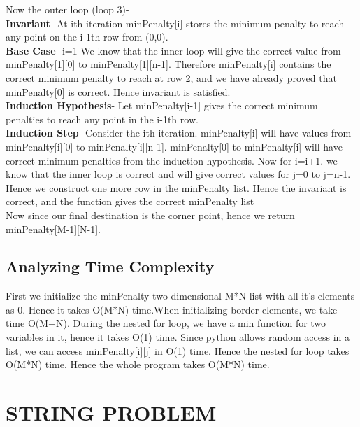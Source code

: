 \documentclass{article}
\begin{document}
Now the outer loop (loop 3)- \\
\textbf{Invariant}- At ith iteration minPenalty[i] stores the minimum penalty to reach any point on the i-1th row from (0,0).\\
\textbf{Base Case}- i=1 We know that the inner loop will give the correct value from minPenalty[1][0] to minPenalty[1][n-1]. Therefore minPenalty[i] contains the correct minimum penalty to reach at row 2, and we have already proved that minPenalty[0] is correct. Hence invariant is satisfied.\\
\textbf{Induction Hypothesis}- Let minPenalty[i-1] gives the correct minimum penalties to reach any point in the i-1th row.\\
\textbf{Induction Step}- Consider the ith iteration. minPenalty[i] will have values from minPenalty[i][0] to minPenalty[i][n-1]. minPenalty[0] to minPenalty[i] will have correct minimum penalties from the induction hypothesis.  Now for i=i+1. we know that the inner loop is correct and will give correct values for j=0 to j=n-1. Hence we construct one more row in the minPenalty list. Hence the invariant is correct, and the function gives the correct minPenalty list\\
Now since our final destination is the corner point, hence we return minPenalty[M-1][N-1]. 

\subsection{Analyzing Time Complexity}
First we initialize the minPenalty two dimensional M*N list with all it's elements as 0. Hence it takes O(M*N) time.When initializing border elements, we take time O(M+N). During the nested for loop, we have a min function for two variables in it, hence it takes O(1) time. Since python allows random access in a list, we can access minPenalty[i][j] in O(1) time. Hence the nested for loop takes O(M*N) time. Hence the whole program takes O(M*N) time.


\section{STRING PROBLEM}
\end{document}

